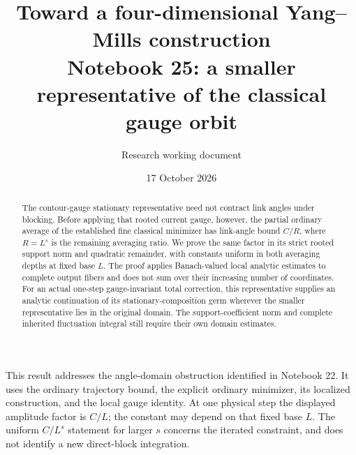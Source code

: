 \documentclass[11pt]{article}
\title{Toward a four-dimensional Yang--Mills construction\\
\large Notebook 25: a smaller representative of the classical gauge orbit}
\author{Research working document}
\date{17 October 2026}
\theoremstyle{remark}
\begin{document}
\maketitle
\begin{abstract}
The contour-gauge stationary representative need not contract
link angles under blocking. Before applying that rooted current
gauge, however, the partial ordinary average of the established
fine classical minimizer has link-angle bound $C/R$, where
$R=L^s$ is the remaining averaging ratio. We prove the same
factor in its strict rooted support norm and quadratic remainder,
with constants uniform in both averaging depths at fixed base
$L$. The proof applies Banach-valued local analytic estimates
to complete output fibers and does not sum over their increasing
number of coordinates. For an actual one-step gauge-invariant
total correction, this representative supplies an analytic
continuation of its stationary-composition germ wherever the
smaller representative lies in the original domain.
The support-coefficient norm and complete inherited fluctuation
integral still require their own domain estimates.
\end{abstract}

This result addresses the angle-domain obstruction identified in
Notebook 22. It uses the ordinary trajectory bound, the explicit
ordinary minimizer, its localized construction, and the local
gauge identity. At one physical step the displayed amplitude
factor is $C/L$; the constant may depend on that fixed base $L$.
The uniform $C/L^s$ statement for larger $s$ concerns the iterated
constraint, and does not identify a new direct-block integration.
\end{document}
